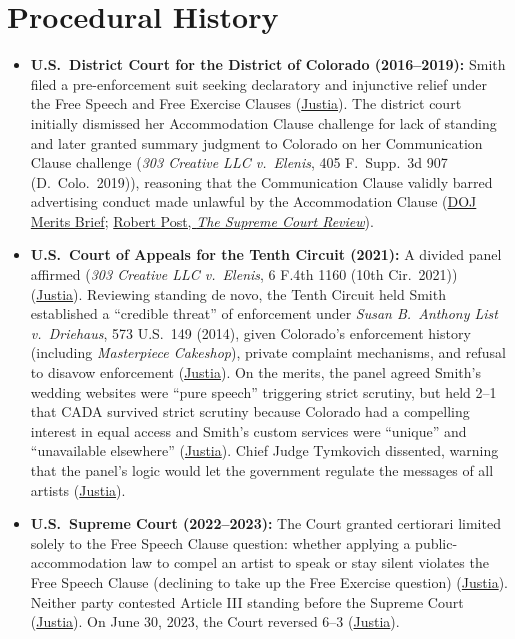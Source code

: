 \documentclass[12pt]{article}
\begin{document}
\section{Procedural History}
\begin{itemize}
  \item \textbf{U.S.\ District Court for the District of Colorado (2016--2019):} Smith filed a pre-enforcement suit seeking declaratory and injunctive relief under the Free Speech and Free Exercise Clauses (\href{https://supreme.justia.com/cases/federal/us/600/21-476/}{Justia}). The district court initially dismissed her Accommodation Clause challenge for lack of standing and later granted summary judgment to Colorado on her Communication Clause challenge (\textit{303 Creative LLC v.\ Elenis}, 405 F.\ Supp.\ 3d 907 (D.\ Colo.\ 2019)), reasoning that the Communication Clause validly barred advertising conduct made unlawful by the Accommodation Clause (\href{https://www.justice.gov/d9/case-documents/attachments/2022/08/19/303_creative_llc_v._elenis_no._21-476_merits_08-19-22.pdf}{DOJ Merits Brief}; \href{https://www.journals.uchicago.edu/doi/pdf/10.1086/728867}{Robert Post, \textit{The Supreme Court Review}}).
  \item \textbf{U.S.\ Court of Appeals for the Tenth Circuit (2021):} A divided panel affirmed (\textit{303 Creative LLC v.\ Elenis}, 6 F.4th 1160 (10th Cir.\ 2021)) (\href{https://supreme.justia.com/cases/federal/us/600/21-476/}{Justia}). Reviewing standing de novo, the Tenth Circuit held Smith established a ``credible threat'' of enforcement under \textit{Susan B.\ Anthony List v.\ Driehaus}, 573 U.S.\ 149 (2014), given Colorado's enforcement history (including \textit{Masterpiece Cakeshop}), private complaint mechanisms, and refusal to disavow enforcement (\href{https://supreme.justia.com/cases/federal/us/600/21-476/}{Justia}). On the merits, the panel agreed Smith's wedding websites were ``pure speech'' triggering strict scrutiny, but held 2--1 that CADA survived strict scrutiny because Colorado had a compelling interest in equal access and Smith's custom services were ``unique'' and ``unavailable elsewhere'' (\href{https://supreme.justia.com/cases/federal/us/600/21-476/}{Justia}). Chief Judge Tymkovich dissented, warning that the panel's logic would let the government regulate the messages of all artists (\href{https://supreme.justia.com/cases/federal/us/600/21-476/}{Justia}).
  \item \textbf{U.S.\ Supreme Court (2022--2023):} The Court granted certiorari limited solely to the Free Speech Clause question: whether applying a public-accommodation law to compel an artist to speak or stay silent violates the Free Speech Clause (declining to take up the Free Exercise question) (\href{https://supreme.justia.com/cases/federal/us/600/21-476/}{Justia}). Neither party contested Article III standing before the Supreme Court (\href{https://supreme.justia.com/cases/federal/us/600/21-476/}{Justia}). On June 30, 2023, the Court reversed 6--3 (\href{https://supreme.justia.com/cases/federal/us/600/21-476/}{Justia}).

\end{itemize}
\end{document}
